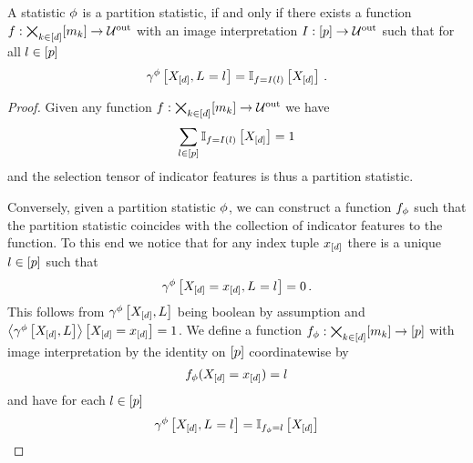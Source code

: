 \begin{lemma}
    \label{lem:partitionStatisticFunctionIndicator}
    A statistic $\phi$ is a partition statistic, if and only if there exists a function $f:\bigtimes_{k\in[d]}[m_{k}]\rightarrow\mathcal{U}^{\mathrm{out}}$ with an image interpretation $I : [p] \rightarrow \mathcal{U}^{\mathrm{out}}$ such that for all $l\in[p]$
    \begin{align*}
        \gamma^{\phi}\left[X_{[d]},L_{}=l_{}\right] = \mathbb{I}_{f=I(l)}\left[X_{[d]}\right] \, .
    \end{align*}
\end{lemma}
\begin{proof}
    \proofleftsymbol
    Given any function $f:\bigtimes_{k\in[d]}[m_{k}]\rightarrow \mathcal{U}^{\mathrm{out}}$ we have
    \begin{align*}
        \sum_{l\in[p]} \mathbb{I}_{f=I(l)}\left[X_{[d]}\right] =1
    \end{align*}
    and the selection tensor of indicator features is thus a partition statistic.

    \proofrightsymbol
    Conversely, given a partition statistic $\phi$, we can construct a function $f_{\phi}$ such that the partition statistic coincides with the collection of indicator features to the function.
    To this end we notice that for any index tuple $x_{[d]}$ there is a unique $l\in[p]$ such that
    \begin{align*}
        \gamma^{\phi}\left[X_{[d]}=x_{[d]},L_{}=l_{}\right] = 0 \, .
    \end{align*}
    This follows from $\gamma^{\phi}\left[X_{[d]},L\right]$ being boolean by assumption and $\left\langle \gamma^{\phi}\left[X_{[d]},L\right]\right\rangle \left[ X_{[d]}=x_{[d]} \right]=1$.
    We define a function $f_{\phi}:\bigtimes_{k\in[d]}[m_{k}]\rightarrow[p]$ with image interpretation by the identity on $[p]$ coordinatewise by
    \begin{align*}
        f_{\phi}(X_{[d]}=x_{[d]}) = l
    \end{align*}
    and have for each $l\in[p]$
    \begin{align*}
        \gamma^{\phi}\left[X_{[d]},L_{}=l_{}\right] = \mathbb{I}_{f_{\phi}=l}\left[X_{[d]}\right]
    \end{align*}
\end{proof}


